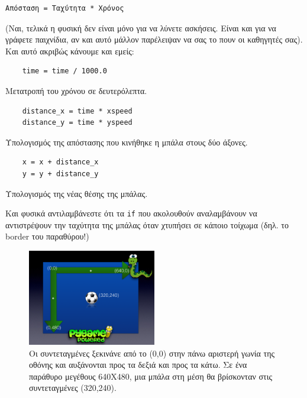 \begin{verbatim}
Απόσταση = Ταχύτητα * Χρόνος
\end{verbatim}

(Ναι, τελικά η φυσική δεν είναι μόνο για να λύνετε ασκήσεις. Είναι και για να γράφετε παιχνίδια, αν και αυτό μάλλον παρέλειψαν να σας το πουν οι καθηγητές σας). Και αυτό ακριβώς κάνουμε και εμείς:

\begin{verbatim}
    time = time / 1000.0
\end{verbatim}

Μετατροπή του χρόνου σε δευτερόλεπτα.

\begin{verbatim}
    distance_x = time * xspeed
    distance_y = time * yspeed
\end{verbatim}

Υπολογισμός της απόστασης που κινήθηκε η μπάλα  στους δύο άξονες.

\begin{verbatim}
    x = x + distance_x
    y = y + distance_y
\end{verbatim}

Υπολογισμός της νέας θέσης της μπάλας.

Και φυσικά αντιλαμβάνεστε ότι τα {\tt if} που ακολουθούν αναλαμβάνουν να αντιστρέψουν την ταχύτητα της μπάλας όταν χτυπήσει σε κάποιο τοίχωμα (δηλ. το border του παραθύρου!)

\begin{figure}
  \centering
  \includegraphics[width=0.5\textwidth]{images/chapter4/coordinates}
  \caption[Συντεταγμένες γραφικών]{Οι συντεταγμένες ξεκινάνε από το (0,0) στην πάνω αριστερή γωνία της οθόνης και αυξάνονται προς τα δεξιά και προς τα κάτω. Σε ένα παράθυρο μεγέθους 640Χ480, μια μπάλα στη μέση θα βρίσκονταν στις συντεταγμένες (320,240).}
  \label{4-4}
\end{figure}

